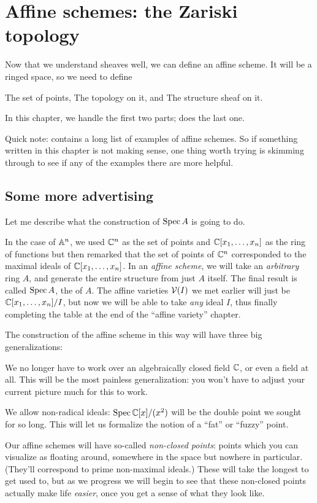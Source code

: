 \chapter{Affine schemes: the Zariski topology}
\label{ch:spec_zariski}
Now that we understand sheaves well,
we can define an affine scheme.
It will be a ringed space, so we need to define
\begin{itemize}
	\ii The set of points,
	\ii The topology on it, and
	\ii The structure sheaf on it.
\end{itemize}
In this chapter, we handle the first two parts;
 does the last one.

Quick note: 
contains a long list of examples of affine schemes.
So if something written in this chapter is not making sense,
one thing worth trying is skimming through 
to see if any of the examples there are more helpful.

\section{Some more advertising}
Let me describe what the construction of $\operatorname{Spec} A$ is going to do.

In the case of $\mathbb A^n$, we used $\mathbb C^n$ as the set of points
and $\mathbb C[x_1, \dots, x_n]$ as the ring of functions
but then remarked that the set of points
of $\mathbb C^n$ corresponded to the maximal ideals of $\mathbb C[x_1, \dots, x_n]$.
In an \emph{affine scheme}, we will take an \emph{arbitrary} ring $A$,
and generate the entire structure from just $A$ itself.
The final result is called $\operatorname{Spec} A$, the  of $A$.
The affine varieties $\mathcal V(I)$ we met earlier will just be
$\mathbb C[x_1, \dots, x_n] / I$, but now we will be able to take
\emph{any} ideal $I$, thus finally completing the table at the end
of the ``affine variety'' chapter.

The construction of the affine scheme in this way
will have three big generalizations:
\begin{enumerate}
	\ii We no longer have to work over an algebraically
	closed field $\mathbb C$, or even a field at all.
	This will be the most painless generalization:
	you won't have to adjust your current picture much for this to work.

	\ii We allow non-radical ideals:
	$\operatorname{Spec} \mathbb C[x] / (x^2)$ will be the double point
	we sought for so long.
	This will let us formalize the notion of a ``fat'' or ``fuzzy'' point.

	\ii Our affine schemes will have so-called \emph{non-closed points}:
	points which you can visualize as floating around,
	somewhere in the space but nowhere in particular.
	(They'll correspond to prime non-maximal ideals.)
	These will take the longest to get used to,
	but as we progress we will begin to see that these non-closed points
	actually make life \emph{easier},
	once you get a sense of what they look like.
\end{enumerate}

